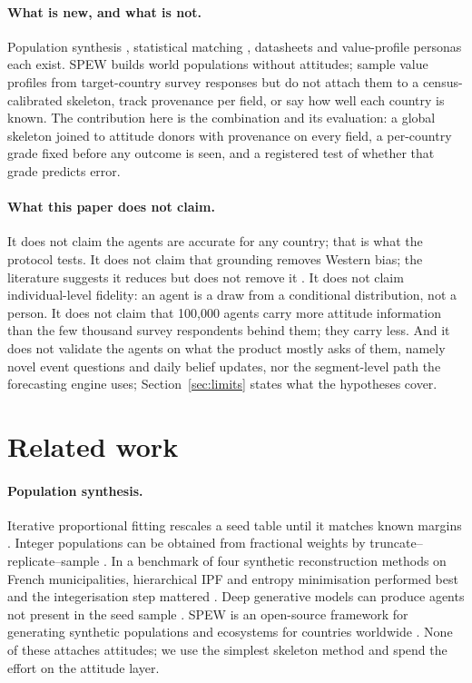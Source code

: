 \documentclass[10pt]{article}
\begin{document}
\paragraph{What is new, and what is not.} Population synthesis \citep{gallagher2018spew}, statistical matching \citep{dorazio2006,rassler2002}, datasheets \citep{gebru2021} and value-profile personas \citep{abels2026} each exist. SPEW builds world populations without attitudes; \citet{abels2026} sample value profiles from target-country survey responses but do not attach them to a census-calibrated skeleton, track provenance per field, or say how well each country is known. The contribution here is the combination and its evaluation: a global skeleton joined to attitude donors with provenance on every field, a per-country grade fixed before any outcome is seen, and a registered test of whether that grade predicts error.

\paragraph{What this paper does not claim.} It does not claim the agents are accurate for any country; that is what the protocol tests. It does not claim that grounding removes Western bias; the literature suggests it reduces but does not remove it \citep{tao2024,bulte2026}. It does not claim individual-level fidelity: an agent is a draw from a conditional distribution, not a person. It does not claim that 100,000 agents carry more attitude information than the few thousand survey respondents behind them; they carry less. And it does not validate the agents on what the product mostly asks of them, namely novel event questions and daily belief updates, nor the segment-level path the forecasting engine uses; Section~\ref{sec:limits} states what the hypotheses cover.

\section{Related work}
\label{sec:related}

\paragraph{Population synthesis.} Iterative proportional fitting rescales a seed table until it matches known margins \citep{deming1940}. Integer populations can be obtained from fractional weights by truncate--replicate--sample \citep{lovelace2013trs}. In a benchmark of four synthetic reconstruction methods on French municipalities, hierarchical IPF and entropy minimisation performed best and the integerisation step mattered \citep{yameogo2021}. Deep generative models can produce agents not present in the seed sample \citep{borysov2019}. SPEW is an open-source framework for generating synthetic populations and ecosystems for countries worldwide \citep{gallagher2018spew}. None of these attaches attitudes; we use the simplest skeleton method and spend the effort on the attitude layer.
\end{document}
